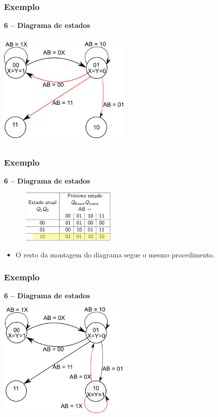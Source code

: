 \documentclass{beamer}
\begin{document}
\begin{frame}
  \frametitle{Exemplo}
  \textbf{6 – Diagrama de estados}
   \begin{center}
    \includegraphics[height = 2.2in, width = 2.5in]
      {images/Diagrama_de_estado_ex4.png}
   \end{center}
\end{frame}

\begin{frame}
  \frametitle{Exemplo}
  \textbf{6 – Diagrama de estados}
  \begin{center}
   \includegraphics[height = 1in, width = 2.7in]
    {images/Diagrama_estado_tabela_3.png}
  \end{center}

  \begin{itemize}
   \item O resto da montagem do diagrama segue o mesmo procedimento. 
  \end{itemize} 
\end{frame}

\begin{frame}
  \frametitle{Exemplo}
  \textbf{6 – Diagrama de estados}
  \begin{center}
   \includegraphics[height = 2.2in, width = 2.5in]
    {images/Diagrama_de_estado_ex5.png}
  \end{center}
\end{frame}
\end{document}
